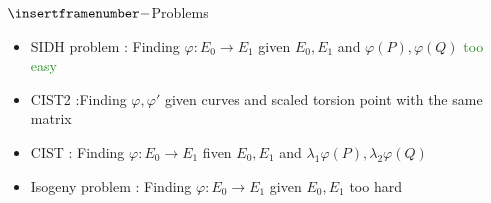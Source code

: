\documentclass[10pt]{beamer}
\def\mcolor {ForestGreen}
\theoremstyle{plain}
\theoremstyle{example}
\begin{document}
\begin{frame}{$\insertframenumber -$Problems}

	\begin{itemize}
		\item SIDH problem : Finding $\varphi:E_0\to E_1$ given  $E_0,E_1$ and
			$\varphi(P),\varphi(Q)$
			\textcolor{\mcolor}{too easy}
		\item CIST2 :Finding $\varphi,\varphi'$ given curves and scaled torsion point with the
			same matrix
		\item CIST : Finding $\varphi:E_0\to E_1$ fiven $E_0,E_1$ and
			$\lambda_1\varphi(P),\lambda_2\varphi(Q)$ 
		\item Isogeny problem : Finding $\varphi:E_0\to E_1$ given  $E_0,E_1$ \alert{too hard}
	\end{itemize}


\end{frame}
%
%
%
%
\end{document}
